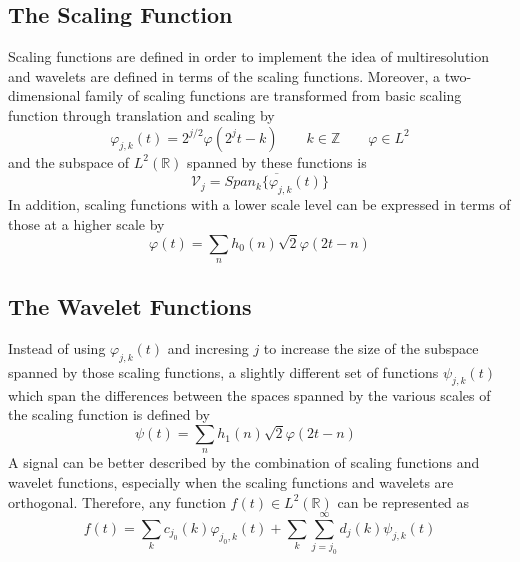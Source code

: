 \subsection{The Scaling Function}
Scaling functions are defined in order to implement the idea of multiresolution and wavelets are defined in terms of the scaling functions. Moreover, a two-dimensional family of scaling functions are transformed from basic scaling function through translation and scaling by
\begin{equation} \varphi_{j,k}(t) = 2^{j/2}\varphi(2^jt-k) \qquad  k \in \mathbb{Z} \qquad \varphi\in L^2  \end{equation}
and the subspace of $L^2(\mathbb{R})$ spanned by these functions is
\begin{equation} \mathcal{V}_j = \overline{Span_k\{\varphi_{j,k}(t) \}}  \end{equation}
In addition, scaling functions with a lower scale level can be expressed in terms of those at a higher scale by
\begin{equation} \varphi(t) = \sum_n h_0(n)\sqrt2\varphi(2t-n) \end{equation}


\subsection{The Wavelet Functions}
Instead of using $\varphi_{j,k}(t)$ and incresing $j$ to increase the size of the subspace spanned by those scaling functions, a slightly different set of functions $\psi_{j,k}(t)$ which span the differences between the spaces spanned by the various scales of the scaling function is defined by
\begin{equation} \psi(t) = \sum_n h_1(n)\sqrt{2}\varphi(2t-n) \qquad \end{equation}
A signal can be better described by the combination of scaling functions and wavelet functions, especially when the scaling functions and wavelets are orthogonal. Therefore, any function $f(t) \in L^2(\mathbb{R})$ can be represented as 
\begin{equation} f(t) = \sum_{k} c_{j_0}(k)\varphi_{j_0,k}(t) + \sum_k\sum_{j=j_0}^{\infty} d_j(k)\psi_{j,k}(t) \end{equation}



